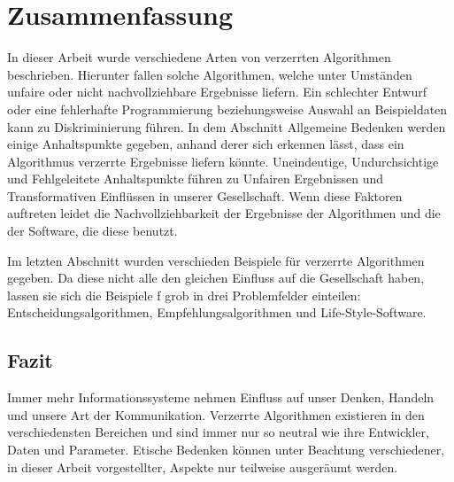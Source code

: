 \chapter{Zusammenfassung}

In dieser Arbeit wurde verschiedene Arten von verzerrten Algorithmen beschrieben. Hierunter fallen solche Algorithmen, welche unter Umständen unfaire oder nicht nachvollziehbare Ergebnisse liefern. Ein schlechter Entwurf oder eine fehlerhafte Programmierung beziehungsweise Auswahl an Beispieldaten kann zu Diskriminierung führen. In dem Abschnitt Allgemeine Bedenken werden einige Anhaltspunkte gegeben, anhand derer sich erkennen lässt, dass ein Algorithmus verzerrte Ergebnisse liefern könnte.  
    Uneindeutige, Undurchsichtige und Fehlgeleitete Anhaltspunkte führen zu Unfairen Ergebnissen und Transformativen Einflüssen in unserer Gesellschaft.
    Wenn diese Faktoren auftreten leidet die Nachvollziehbarkeit der Ergebnisse der Algorithmen und die der Software, die diese benutzt.

Im letzten Abschnitt wurden verschieden Beispiele für verzerrte Algorithmen gegeben. Da diese nicht alle den gleichen Einfluss auf die Gesellschaft haben, lassen sie sich die Beispiele f
grob in drei Problemfelder einteilen: Entscheidungsalgorithmen, Empfehlungsalgorithmen und Life-Style-Software. 

\section{Fazit}
Immer mehr Informationssysteme nehmen Einfluss auf unser Denken, Handeln und unsere Art der Kommunikation. Verzerrte Algorithmen existieren in den verschiedensten Bereichen und sind immer nur so neutral wie ihre Entwickler, Daten und Parameter. Etische Bedenken können unter Beachtung verschiedener, in dieser Arbeit vorgestellter, Aspekte nur teilweise ausgeräumt werden.

